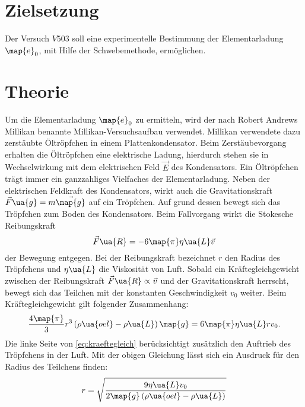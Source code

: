 \setcounter{page}{1}
\section*{Zielsetzung}
Der Versuch $V503$ soll eine experimentelle Bestimmung der Elementarladung $\map{e}_0$, mit Hilfe der Schwebemethode, ermöglichen.
\section{Theorie}
Um die Elementarladung $\map{e}_0$ zu ermitteln, wird der nach Robert Andrews Millikan benannte %
Millikan-Versuchsaufbau verwendet. Millikan verwendete dazu zerstäubte Öltröpfchen in einem %
Plattenkondensator. Beim Zerstäubevorgang erhalten die Öltröpfchen eine elektrische
Ladung, hierdurch stehen sie in Wechselwirkung mit dem elektrischen Feld $\vec{E}$ des
Kondensators. Ein Öltröpfchen trägt immer ein ganzzahliges Vielfaches der Elementarladung. %
Neben der elektrischen Feldkraft des Kondensators, wirkt auch die Gravitationskraft %
$\vec{F}\ua{g}=m\vec{\map{g}}$ auf ein Tröpfchen. %
Auf grund dessen bewegt sich das Tröpfchen zum Boden
des Kondensators. Beim Fallvorgang wirkt die Stokesche Reibungskraft %
\begin{equation*}
  \vec{F}\ua{R}=-6\map{\pi}\eta\ua{L}\vec{v}
\end{equation*}
der Bewegung entgegen. Bei der Reibungskraft bezeichnet $r$ den Radius des
Tröpfchens und $\eta\ua{L}$ die Viskosität von Luft. Sobald ein Kräftegleichgewicht
zwischen der Reibungskraft $\vec{F}\ua{R}\propto \vec{v}$ und der Gravitationskraft
herrscht, bewegt sich das Teilchen mit der konstanten Geschwindigkeit $v_0$ weiter.
Beim Kräftegleichgewicht gilt folgender Zusammenhang:
\begin{equation}
  \label{eq:kraeftegleich}
  \frac{4\map{\pi}}{3}r^3\left(\rho\ua{oel}-\rho\ua{L}\right)\map{g}=6\map{\pi}\eta\ua{L}r v_0.
\end{equation}
Die linke Seite von \eqref{eq:kraeftegleich} berücksichtigt zusätzlich den Auftrieb des %
Tröpfchens in der Luft. Mit der obigen Gleichung lässt sich ein Ausdruck für den Radius %
des Teilchens finden: %
\begin{equation}
  \label{eq:radius_teilchen}
  r=\sqrt{\frac{9\eta\ua{L}v_0}{2\map{g}\left(\rho\ua{oel}-\rho\ua{L}\right)}}
\end{equation}
